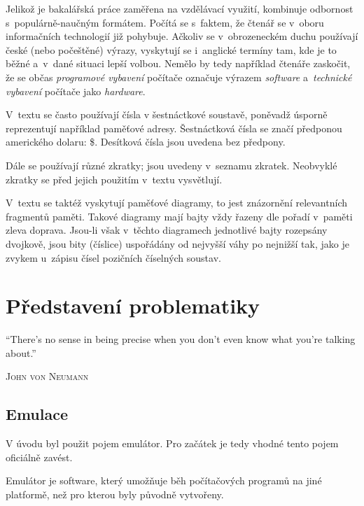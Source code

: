 \begin{note*}[Terminologie]
	Jelikož je bakalářská práce zaměřena na vzdělávací využití, kombinuje odbornost s~populárně-naučným formátem. Počítá se s~faktem, že čtenář se v~oboru informačních technologií již pohybuje. Ačkoliv se v~obrozeneckém duchu používají české (nebo počeštěné) výrazy, vyskytují se i~anglické termíny tam, kde je to běžné a~v~dané situaci lepší volbou. Nemělo by tedy například čtenáře zaskočit, že se občas \emph{programové vybavení} počítače označuje výrazem \emph{software} a~\emph{technické vybavení} počítače jako \emph{hardware}.	
\end{note*}

\begin{note*}[Značení]
	V~textu se často používají čísla v šestnáctkové soustavě, poněvadž úsporně reprezentují například paměťové adresy. Šestnáctková čísla se značí předponou amerického dolaru: \$. Desítková čísla jsou uvedena bez předpony.
	
	Dále se používají různé zkratky; jsou uvedeny v~seznamu zkratek. Neobvyklé zkratky se před jejich použitím v~textu vysvětlují.
	
	V~textu se taktéž vyskytují paměťové diagramy, to jest znázornění relevantních fragmentů paměti. Takové diagramy mají bajty vždy řazeny dle pořadí v~paměti zleva doprava. Jsou-li však v~těchto diagramech jednotlivé bajty rozepsány dvojkově, jsou bity (číslice) uspořádány od nejvyšší váhy po nejnižší tak, jako je zvykem u~zápisu čísel pozičních číselných soustav.
\end{note*}

\chapter{Představení problematiky}
\label{chap:predstaveni-problematiky}

\epigraph{
	\enquote{There's no sense in being precise when you don't even know what you're talking about.}
}{\textsc{John von Neumann}}

\section{Emulace}
V úvodu byl použit pojem emulátor. Pro začátek je tedy vhodné tento pojem oficiálně zavést.

\begin{definition}[Emulátor]
	Emulátor je software, který umožňuje běh počítačových programů na jiné platformě, než pro kterou byly původně vytvořeny.~
\end{definition}

